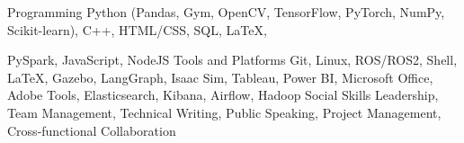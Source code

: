 

\begin{cvskills}

  \cvskill
    {Programming} %
    {Python (Pandas, Gym, OpenCV, TensorFlow, PyTorch, NumPy, Scikit-learn), C++, HTML/CSS, SQL, LaTeX,} %

  \cvskill
    {} %
    {PySpark, JavaScript, NodeJS} %
  \cvskill
    {Tools and Platforms} %
    {Git, Linux, ROS/ROS2, Shell, LaTeX, Gazebo, LangGraph, Isaac Sim, Tableau, Power BI, Microsoft Office, } %
  \cvskill
    {} %
    {Adobe Tools, Elasticsearch, Kibana, Airflow, Hadoop} %
  \cvskill
    {Social Skills} %
    {Leadership, Team Management, Technical Writing, Public Speaking, } %
  \cvskill
    {} %
    {Project Management, Cross-functional Collaboration} %

\end{cvskills}